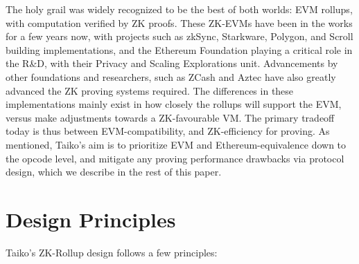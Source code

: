 \documentclass[9pt,oneside]{amsart}
\begin{document}
\begin{multicols}{2}
The holy grail was widely recognized to be the best of both worlds: EVM rollups, with computation verified by ZK proofs. These ZK-EVMs have been in the works for a few years now, with projects such as zkSync, Starkware, Polygon, and Scroll building implementations, and the Ethereum Foundation playing a critical role in the R\&D, with their Privacy and Scaling Explorations unit. Advancements by other foundations and researchers, such as ZCash and Aztec have also greatly advanced the ZK proving systems required. The differences in these implementations mainly exist in how closely the rollups will support the EVM, versus make adjustments towards a ZK-favourable VM. The primary tradeoff today is thus between EVM-compatibility, and ZK-efficiency for proving. As mentioned, Taiko’s aim is to prioritize EVM and Ethereum-equivalence down to the opcode level, and mitigate any proving performance drawbacks via protocol design, which we describe in the rest of this paper. 


\color{black}

\section{Design Principles}

Taiko's ZK-Rollup design follows a few principles:


\end{multicols}
\end{document}
